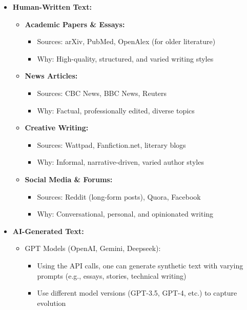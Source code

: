 \documentclass{article} %
\begin{document}
\begin{itemize}
    \item \textbf{Human-Written Text:}
    \begin{itemize}
        \item \textbf{Academic Papers \& Essays:}
        \begin{itemize}
            \item Sources: arXiv, PubMed, OpenAlex (for older literature)
            \item Why: High-quality, structured, and varied writing styles
        \end{itemize}
        
        \item \textbf{News Articles:}
        \begin{itemize}
            \item Sources: CBC News, BBC News, Reuters
            \item Why: Factual, professionally edited, diverse topics
        \end{itemize}
        
        \item \textbf{Creative Writing:}
        \begin{itemize}
            \item Sources: Wattpad, Fanfiction.net, literary blogs
            \item Why: Informal, narrative-driven, varied author styles
        \end{itemize}
        
        \item \textbf{Social Media \& Forums:}
        \begin{itemize}
            \item Sources: Reddit (long-form posts), Quora, Facebook
            \item Why: Conversational, personal, and opinionated writing
        \end{itemize}
    \end{itemize}
    
    \item \textbf{AI-Generated Text:}
    \begin{itemize}
        \item GPT Models (OpenAI, Gemini, Deepseek):
        \begin{itemize}
            \item Using the API calls, one can generate synthetic text with varying prompts (e.g., essays, stories, technical writing)
            \item Use different model versions (GPT-3.5, GPT-4, etc.) to capture evolution
        \end{itemize}


\end{itemize}
\end{itemize}
\end{document}
